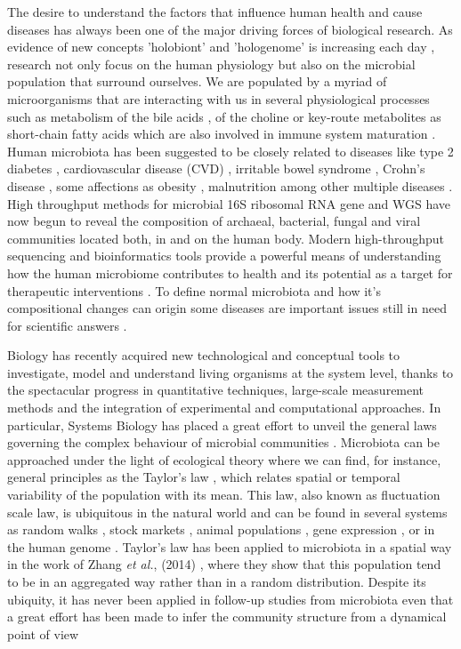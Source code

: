 The desire to understand the factors that influence human health and cause diseases has always been one of the major driving forces of biological research. As evidence of new concepts 'holobiont' and 'hologenome' is increasing each day \cite{holo1, holo2}, research not only focus on the human physiology but also on the microbial population that surround ourselves. We are populated by a myriad of microorganisms that are interacting with us in several physiological processes such as metabolism of the bile acids \cite{bileacids}, of the choline \cite{choline} or key-route metabolites as short-chain fatty acids \cite{scfa1, scfa2} which are also involved in immune system maturation \cite{scfa3, scfa4}. Human microbiota has been suggested to be closely related to diseases like type 2 diabetes \cite{diabetes2}, cardiovascular disease (CVD) \cite{CVD}, irritable bowel syndrome \cite{IBS}, Crohn's disease \cite{CD}, some affections as obesity \cite{ob1, ob2}, malnutrition \cite{nutr} among other multiple diseases \cite{Moya_trends}. High throughput methods for microbial 16S ribosomal RNA gene and WGS have now begun to reveal the composition of archaeal, bacterial, fungal and viral communities located both, in and on the human body. Modern high-throughput sequencing and bioinformatics tools provide a powerful means of understanding how the human microbiome contributes to health and its potential as a target for therapeutic interventions \cite{microb&health}. To define normal microbiota and how it's compositional changes can origin some diseases are important issues still in need for scientific answers \cite{normal1, normal2}.

Biology has recently acquired new technological and conceptual tools to investigate, model and understand living organisms at the system level, thanks to the spectacular progress in quantitative techniques, large-scale measurement methods and the integration of experimental and computational approaches. In particular, Systems Biology has placed a great effort to unveil the general laws governing the complex behaviour of microbial communities \cite{sysbio&microb, msys1, metasysbio}. Microbiota can be approached under the light of ecological theory where we can find, for instance, general principles as the Taylor's law \cite{taylor}, which relates spatial or temporal variability of the population with its mean. This law, also known as fluctuation scale law, is ubiquitous in the natural world and can be found in several systems as random walks \cite{randomwalks}, stock markets \cite{economics1, economics2}, animal populations \cite{taylor, animal1, animal2}, gene expression \cite{genexpress}, or in the human genome \cite{genome}. Taylor's law has been applied to microbiota in a spatial way in the work of Zhang {\it et al.}, (2014) \cite{isme1}, where they show that this population tend to be in an aggregated way rather than in a random distribution. Despite its ubiquity, it has never been applied in follow-up studies from microbiota even that a great effort has been made to infer the community structure from a dynamical point of view \cite{cobas, schloss, ravel}  

